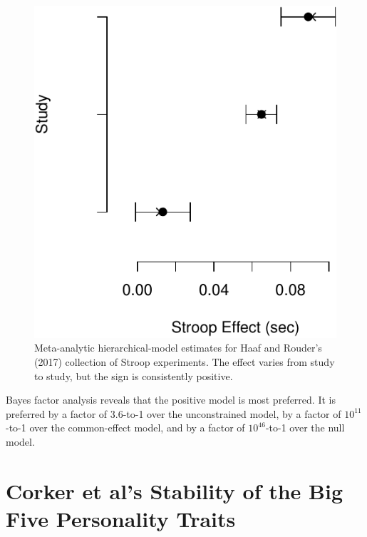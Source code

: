\documentclass[english,man]{apa6}
\theoremstyle{definition}
\theoremstyle{definition}
\theoremstyle{remark}
\begin{document}
\begin{figure}[htbp]
\centering
\includegraphics{pBlind_files/figure-latex/hrEst-1.pdf}
\caption{\label{fig:hrEst}Meta-analytic hierarchical-model estimates for
Haaf and Rouder's (2017) collection of Stroop experiments. The effect
varies from study to study, but the sign is consistently positive.}
\end{figure}

Bayes factor analysis reveals that the positive model is most preferred.
It is preferred by a factor of 3.6-to-1 over the unconstrained model, by
a factor of \(10^{11}\)-to-1 over the common-effect model, and by a
factor of \(10^{46}\)-to-1 over the null model.

\section{Corker et al's Stability of the Big Five Personality
Traits}\label{corker-et-als-stability-of-the-big-five-personality-traits}
\end{document}
